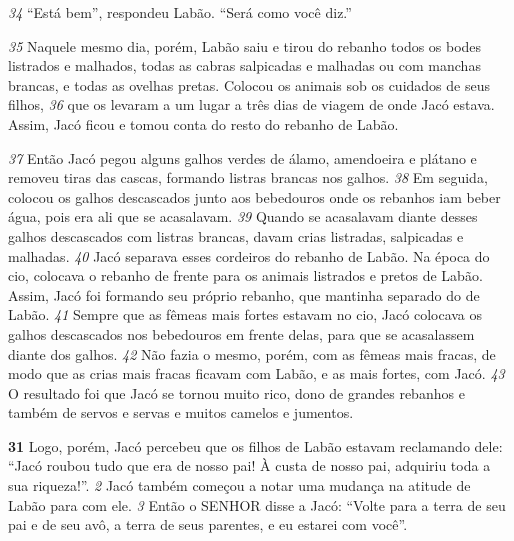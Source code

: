 \bigskip   
\textit{\tiny 34}
“Está bem”, respondeu Labão. “Será como você diz.” 

\bigskip   
\textit{\tiny 35}
Naquele mesmo dia,
porém, Labão saiu e tirou do rebanho todos os bodes listrados e malhados, todas
as cabras salpicadas e malhadas ou com manchas brancas, e todas as ovelhas
pretas. Colocou os animais sob os cuidados de seus filhos, 
\textit{\tiny 36}
que os levaram a um
lugar a três dias de viagem de onde Jacó estava. Assim, Jacó ficou e tomou conta
do resto do rebanho de Labão.

\bigskip   
\textit{\tiny 37}
Então Jacó pegou alguns galhos verdes de álamo, amendoeira e plátano e
removeu tiras das cascas, formando listras brancas nos galhos. 
\textit{\tiny 38}
Em seguida,
colocou os galhos descascados junto aos bebedouros onde os rebanhos iam beber
água, pois era ali que se acasalavam. 
\textit{\tiny 39}
Quando se acasalavam diante desses galhos
descascados com listras brancas, davam crias listradas, salpicadas e malhadas.
\textit{\tiny 40}
Jacó separava esses cordeiros do rebanho de Labão. Na época do cio, colocava o
rebanho de frente para os animais listrados e pretos de Labão. Assim, Jacó foi
formando seu próprio rebanho, que mantinha separado do de Labão.
\textit{\tiny 41}
Sempre que as fêmeas mais fortes estavam no cio, Jacó colocava os galhos
descascados nos bebedouros em frente delas, para que se acasalassem diante dos
galhos. 
\textit{\tiny 42}
Não fazia o mesmo, porém, com as fêmeas mais fracas, de modo que as
crias mais fracas ficavam com Labão, e as mais fortes, com Jacó. 
\textit{\tiny 43}
O resultado foi
que Jacó se tornou muito rico, dono de grandes rebanhos e também de servos e
servas e muitos camelos e jumentos.

\bigskip   
\textbf{\large 31}
 Logo, porém, Jacó percebeu que os filhos de Labão estavam reclamando
dele: “Jacó roubou tudo que era de nosso pai! À custa de nosso pai, adquiriu toda a
sua riqueza!”. 
\textit{\tiny 2} 
Jacó também começou a notar uma mudança na atitude de Labão
para com ele.
\textit{\tiny 3} 
Então o SENHOR disse a Jacó: “Volte para a terra de seu pai e de seu avô, a terra
de seus parentes, e eu estarei com você”.

